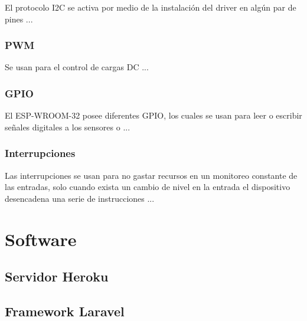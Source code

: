 El protocolo I2C se activa por medio de la instalación del driver en algún par de pines ...

\subsubsection{PWM}

Se usan para el control de cargas DC ...

\subsubsection{GPIO}

El ESP-WROOM-32 posee diferentes GPIO, los cuales se usan para leer o escribir señales digitales a los sensores o ...

\subsubsection{Interrupciones}

Las interrupciones se usan para no gastar recursos en un monitoreo constante de las entradas, solo cuando exista un cambio de nivel en la entrada el dispositivo desencadena una serie de instrucciones ...

\section{Software}

\subsection{Servidor Heroku}

\subsection{Framework Laravel}
